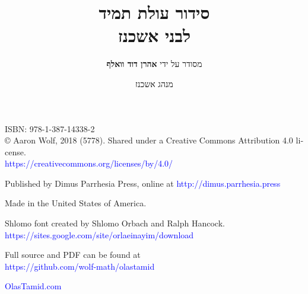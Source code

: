 \documentclass[twoside, openany, parskip=half, 11pt]{book}
\begin{document}
\title{  סידור עולת תמיד \\
לבני אשכנז\\
\vspace{.5in}
}

\author{מסודר על ידי
\textbf{אהרן דוד וואלף}}
\date{מנהג אשכנז}

\maketitle

\begin{minipage}{\textwidth}
\begin{english}
\raggedright

ISBN: 978-1-387-14338-2\\

© Aaron Wolf, 2018 (5778). Shared under a Creative Commons Attribution 4.0 license.\\
\textcolor{blue}{https://creativecommons.org/licenses/by/4.0/}\\ \vspace{\baselineskip}

Published by Dimus Parrhesia Press, online at
\textcolor{blue}{http://dimus.parrhesia.press}\\ \vspace{\baselineskip}

Made in the United States of America.\\ \vspace{\baselineskip}

Shlomo font created by Shlomo Orbach and Ralph Hancock.\\ \textcolor{blue}{https://sites.google.com/site/orlaeinayim/download}\\ \vspace{\baselineskip}

Full \XeLaTeX \quad source and PDF can be found at\\ \textcolor{blue}{https://github.com/wolf-math/olastamid}\\ \vspace{\baselineskip}

\textcolor{blue}{OlasTamid.com}

\end{english}
\end{minipage}


\clearpage
\end{document}
